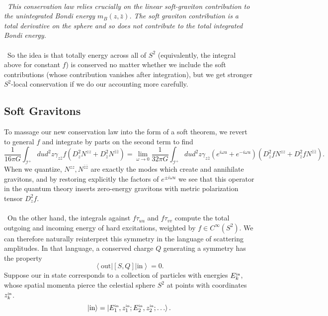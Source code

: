 \documentclass[11pt,letterpaper]{article}
\newcommand{\LP}{\left(}
\newcommand{\RP}{\right)}
\newcommand{\mc}[1]{\mathcal{#1}}
\newcommand{\KET}[1]{\left| #1 \right\rangle }
\newcommand{\BRA}[1]{\left\langle #1 \right| }
\begin{document}
\\
\
\textit{This conservation law relies crucially on the linear soft-graviton contribution to the unintegrated Bondi energy $m_B(z, \bar{z})$. The soft graviton contribution is a total derivative on the sphere and so does not contribute to the total integrated Bondi energy.}\\
\\
\
So the idea is that totally energy across all of $S^2$ (equivalently, the integral above for constant $f$) is conserved no matter whether we include the soft contributions (whose contribution vanishes after integration), but we get stronger $S^2$-local conservation if we do our accounting more carefully.




\subsection{Soft Gravitons}
To massage our new conservation law into the form of a soft theorem, we revert to general $f$ and integrate by parts on the second term to find \begin{equation}
\frac{1}{16 \pi G} \int_{\mc{I}^+} du d^2 z \gamma_{z \bar{z}} f \LP D_z^2 N^{zz} + D_{\bar{z}}^2 N^{\bar{z} \bar{z}} \RP = \lim_{\omega \to 0} \frac{1}{32 \pi G} \int_{\mc{I}^+} du d^2 z \gamma_{z \bar{z}} \LP e^{i \omega u} + e^{- i \omega u} \RP \LP D_z^2 f N^{zz} + D_{\bar{z}}^2 f  N^{\bar{z} \bar{z}} \RP.
\end{equation}
When we quantize, $N^{zz}, N^{\bar{z} \bar{z}}$ are exactly the modes which create and annihilate gravitons, and by restoring explicitly the factors of $e^{\pm i \omega u}$ we see that this operator in the quantum theory inserts zero-energy gravitons with metric polarization tensor $D_z^2 f$.\\
\\
\
On the other hand, the integrals against $f \tau_{uu}$ and $f \tau_{vv}$ compute the total outgoing and incoming energy of hard excitations, weighted by $f \in C^\infty(S^2)$. We can therefore naturally reinterpret this symmetry in the language of scattering amplitudes. In that language, a conserved charge $Q$ generating a symmetry has the property \begin{equation}
\BRA{\mbox{out}} [S, Q] \KET{\mbox{in}} = 0.
\end{equation}
Suppose our in state corresponds to a collection of particles with energies $E_k^{\mbox{\tiny{in}}}$, whose spatial momenta pierce the celestial sphere $S^2$ at points with coordinates $z_k^{\mbox{\tiny{in}}}$. \begin{equation}
\KET{\mbox{in}} = \KET{E_1^{\mbox{\tiny{in}}}, z_1^{\mbox{\tiny{in}}}; E_2^{\mbox{\tiny{in}}}, z_2^{\mbox{\tiny{in}}}; \ldots }.
\end{equation}
\end{document}
